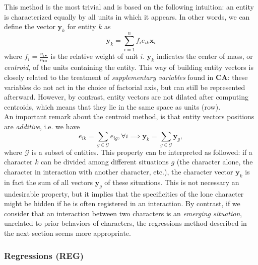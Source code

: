 \documentclass[
twocolumn,
]{ceurart}
\begin{document}
This method is the most trivial and is based on the following intuition: an entity is characterized equally by all units in which it appears. In other words, we can define the vector $\mathbf{y}_k$ for entity $k$ as
\begin{equation}
\mathbf{y}_k = \sum_{i=1}^n f_i e_{ik} \mathbf{x}_i
\end{equation}
where $f_i = \frac{n_{i \bullet}}{n_{\bullet \bullet}}$ is the relative weight of unit $i$. $\mathbf{y}_k$ indicates the center of mass, or \emph{centroid}, of the units containing the entity. This way of building entity vectors is closely related to the treatment of \emph{supplementary variables} found in \textbf{CA}: these variables do not act in the choice of factorial axis, but can still be represented afterward. However, by contrast, entity vectors are not dilated after computing centroids, which means that they lie in the same space as units (row). \\
An important remark about the centroid method, is that entity vectors positions are \emph{additive}, i.e. we have
\begin{equation}
e_{ik} = \sum_{g \in \mathcal{G}} e_{ig}, \forall i \implies \mathbf{y}_k = \sum_{g \in \mathcal{G}} \mathbf{y}_g,
\end{equation}
where $\mathcal{G}$ is a subset of entities. This property can be interpreted as followed: if a character $k$ can be divided among different situations $g$ (the character alone, the character in interaction with another character, etc.), the character vector $\mathbf{y}_k$ is in fact the sum of all vectors $\mathbf{y}_g$ of these situations. This is not necessary an undesirable property, but it implies that the specificities of the lone character might be hidden if he is often registered in an interaction. By contrast, if we consider that an interaction between two characters is an \emph{emerging situation}, unrelated to prior behaviors of characters, the regressions method described in the next section seems more appropriate.

\subsubsection{Regressions (REG)}
\label{regression}
\end{document}

